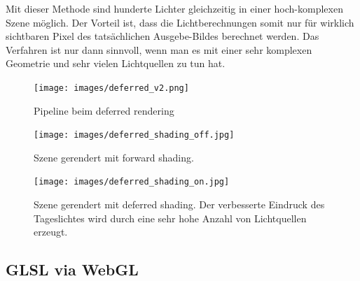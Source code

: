 Mit dieser Methode sind hunderte Lichter gleichzeitig in einer hoch-komplexen Szene möglich.
Der Vorteil ist, dass die Lichtberechnungen somit nur für wirklich sichtbaren Pixel des tatsächlichen Ausgebe-Bildes  berechnet werden.
Das Verfahren ist nur dann sinnvoll, wenn man es mit einer sehr komplexen Geometrie und sehr vielen Lichtquellen zu tun hat. 

\begin{figure}[H]
    \centering
    \texttt{[image: images/deferred\_v2.png]}
    \caption{Pipeline beim deferred rendering} %
    \label{fig:defferedshading}
\end{figure}



\begin{figure}[H]
    \centering
    \texttt{[image: images/deferred\_shading\_off.jpg]}
    \caption{Szene gerendert mit forward shading. } %
    \label{fig:defferedshading}
\end{figure}



\begin{figure}[H]
    \centering
    \texttt{[image: images/deferred\_shading\_on.jpg]}
    \caption{Szene gerendert mit  deferred shading. Der verbesserte  Eindruck des Tageslichtes wird durch eine sehr hohe Anzahl von Lichtquellen erzeugt.} %
    \label{fig:defferedshading}
\end{figure}



\subsection{GLSL via WebGL}
